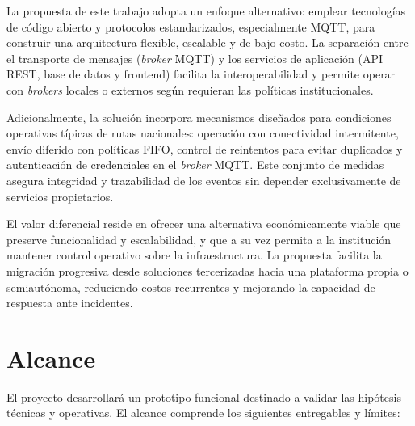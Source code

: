 La propuesta de este trabajo adopta un enfoque alternativo: emplear tecnologías de código abierto y protocolos estandarizados, especialmente MQTT, para construir una arquitectura flexible, escalable y de bajo costo. La separación entre el transporte de mensajes (\textit{broker} MQTT) y los servicios de aplicación (API REST, base de datos y frontend) facilita la interoperabilidad y permite operar con \textit{brokers} locales o externos según requieran las políticas institucionales.

Adicionalmente, la solución incorpora mecanismos diseñados para condiciones operativas típicas de rutas nacionales: operación con conectividad intermitente, envío diferido con políticas FIFO, control de reintentos para evitar duplicados y autenticación de credenciales en el \textit{broker} MQTT. Este conjunto de medidas asegura integridad y trazabilidad de los eventos sin depender exclusivamente de servicios propietarios.

El valor diferencial reside en ofrecer una alternativa económicamente viable que preserve funcionalidad y escalabilidad, y que a su vez permita a la institución mantener control operativo sobre la infraestructura. La propuesta facilita la migración progresiva desde soluciones tercerizadas hacia una plataforma propia o semiautónoma, reduciendo costos recurrentes y mejorando la capacidad de respuesta ante incidentes.

\newpage

\section{Alcance}
El proyecto desarrollará un prototipo funcional destinado a validar las hipótesis técnicas y operativas. El alcance comprende los siguientes entregables y límites:

